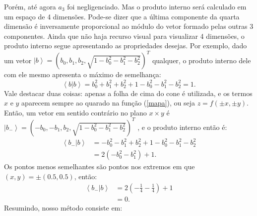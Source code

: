 Porém, até agora  $a_3$ foi negligenciado. Mas o produto interno será calculado em um espaço de 4 dimensões. Pode-se dizer que a última componente da quarta dimensão é inversamente proporcional ao módulo do vetor formado pelas outras 3 componentes. Ainda que não haja recurso visual para visualizar 4 dimensões, o produto interno segue apresentando as propriedades desejas. Por exemplo, dado um vetor $\left|b\right\rangle=\left(b_{0},b_{1},b_{2},\sqrt{1-b_{0}^{2}-b_{1}^{2}-b_{2}^{2}}\right)^{T}$ qualquer, o produto interno dele com ele mesmo apresenta o máximo de semelhança:
\begin{equation}
\left\langle b|b\right\rangle =b_{0}^{2}+b_{1}^{2}+b_{2}^{2}+1-b_{0}^{2}-b_{1}^{2}-b_{2}^{2}=1
. \end{equation}
Vale destacar duas coisas: apenas a folha de cima do cone é utilizada, e os termos $x$ e $y$ aparecem sempre ao quarado na função (\ref{mapa}), ou seja $z=f\left(\pm x,\pm y\right)$. Então,  um vetor em sentido contrário no plano $x\times y$  é $\left|b_{-}\right\rangle=\left(-b_{0},-b_{1},b_{2},\sqrt{1-b_{0}^{2}-b_{1}^{2}-b_{2}^{2}}\right)^{T}$ , e o produto interno então é:
\begin{equation}
\begin{split}
\left\langle b_{-}|b\right\rangle & =-b_{0}^{2}-b_{1}^{2}+b_{2}^{2}+1-b_{0}^{2}-b_{1}^{2}-b_{2}^{2} \\
& = 2\left(-b_{0}^{2}-b_{1}^{2}\right)+1.
\end{split}
 \end{equation}
Os pontos menos semelhantes são pontos nos extremos em que $\left(x,y\right)=\pm \left(0.5,0.5\right)$, então:
\begin{equation}
\begin{split}
\left\langle b_{-}|b\right\rangle  & =2\left(-\frac{1}{4}-\frac{1}{4}\right)+1 \\
& =0.
\end{split}
\end{equation}
Resumindo, nosso método consiste em: 
